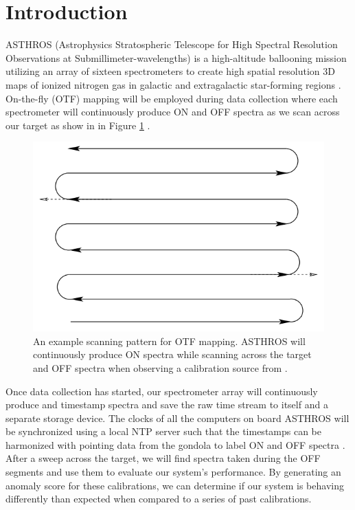 \section{Introduction}
ASTHROS (Astrophysics Stratospheric Telescope for High Spectral Resolution Observations at Submillimeter-wavelengths) is a high-altitude ballooning mission utilizing an array of sixteen spectrometers to create high spatial resolution 3D maps of ionized nitrogen gas in galactic and extragalactic star-forming regions \parencite{siles2020asthros}. 
On-the-fly (OTF) mapping will be employed during data collection where each spectrometer will continuously produce ON and OFF spectra as we scan across our target as show in in Figure \ref{spectra/fig:scan} \parencite{mangum2007fly}. 

\begin{figure}
    \centering
    \includegraphics[width=0.5\linewidth]{figs/spectra/scan.png}
    \caption[On-the-Fly Mapping Scanning Pattern Demonstrating On and Off Observations]{An example scanning pattern for OTF mapping. ASTHROS will continuously produce ON spectra while scanning across the target and OFF spectra when observing a calibration source from \parencite{mangum2007fly}.}
    \label{spectra/fig:scan}
\end{figure}

Once data collection has started, our spectrometer array will continuously produce and timestamp spectra and save the raw time stream to itself and a separate storage device. 
The clocks of all the computers on board ASTHROS will be synchronized using a local NTP server such that the timestamps can be harmonized with pointing data from the gondola to label ON and OFF spectra \parencite{mills1991internet}.
After a sweep across the target, we will find spectra taken during the OFF segments and use them to evaluate our system's performance.
By generating an anomaly score for these calibrations, we can determine if our system is behaving differently than expected when compared to a series of past calibrations.

